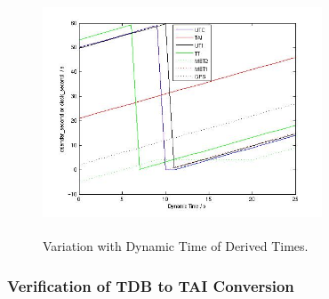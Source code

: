 \begin{description}
\begin{itemize}
\end{itemize}
  
\begin{figure}[htp]
\begin{center}
\includegraphics[width=3.2736in,height=2.85in]{figures/sim5_seconds.jpg}
\caption{Variation with Dynamic Time of Derived Times.}\label{fig:sim5}
\end{center}
\end{figure}
  
  

\end{description}














\clearpage




\subsubsection{Verification of TDB to TAI Conversion}

